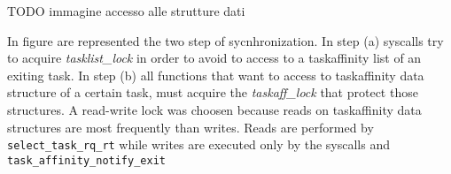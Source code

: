 TODO immagine accesso alle strutture dati

In figure are represented the two step of sycnhronization. In step (a) syscalls try to acquire \textit{tasklist\_lock} in order to avoid to access to a 
taskaffinity list of an exiting task. In step (b) all functions that want to access to taskaffinity data structure of a certain task, must acquire the
\textit{taskaff\_lock} that protect those structures. A read-write lock was choosen because reads on taskaffinity data structures are most frequently than 
writes. Reads are performed by \texttt{select\_task\_rq\_rt} while writes are executed only by the syscalls and \texttt{task\_affinity\_notify\_exit}




